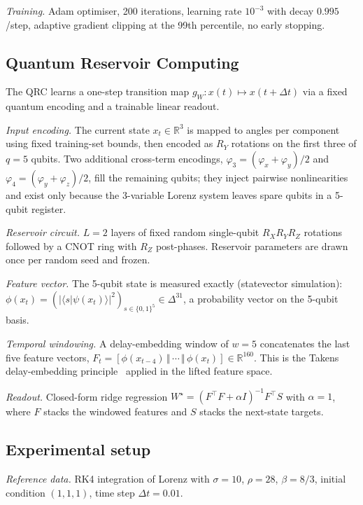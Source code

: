 \documentclass[a4paper,12pt]{iopart}
\begin{document}
\textit{Training.} Adam optimiser, 200 iterations, learning rate
$10^{-3}$ with decay $0.995$/step, adaptive gradient clipping at the
99th percentile, no early stopping.

\subsection{Quantum Reservoir Computing}

The QRC learns a one-step transition map
$g_W : x(t) \mapsto x(t + \Delta t)$ via a fixed quantum encoding and
a trainable linear readout.

\textit{Input encoding.} The current state $x_t \in \mathbb{R}^3$ is
mapped to angles per component using fixed training-set bounds, then
encoded as $R_Y$ rotations on the first three of $q = 5$ qubits. Two
additional cross-term encodings,
$\varphi_3 = (\varphi_x + \varphi_y)/2$ and
$\varphi_4 = (\varphi_y + \varphi_z)/2$, fill the remaining qubits;
they inject pairwise nonlinearities and exist only because the
3-variable Lorenz system leaves spare qubits in a 5-qubit register.

\textit{Reservoir circuit.} $L = 2$ layers of fixed random single-qubit
$R_X R_Y R_Z$ rotations followed by a CNOT ring with $R_Z$ post-phases.
Reservoir parameters are drawn once per random seed and frozen.

\textit{Feature vector.} The 5-qubit state is measured exactly
(statevector simulation):
$\phi(x_t) = (|\langle s | \psi(x_t)\rangle|^2)_{s \in \{0,1\}^5} \in \Delta^{31}$,
a probability vector on the 5-qubit basis.

\textit{Temporal windowing.} A delay-embedding window of $w = 5$
concatenates the last five feature vectors,
$F_t = [\phi(x_{t-4}) \,\Vert\, \cdots \,\Vert\, \phi(x_t)] \in \mathbb{R}^{160}$.
This is the Takens delay-embedding principle~\cite{takens1981} applied
in the lifted feature space.

\textit{Readout.} Closed-form ridge regression
$W^\star = (F^\top F + \alpha I)^{-1} F^\top S$ with $\alpha = 1$,
where $F$ stacks the windowed features and $S$ stacks the next-state
targets.

\subsection{Experimental setup}

\textit{Reference data.} RK4 integration of Lorenz with $\sigma = 10$,
$\rho = 28$, $\beta = 8/3$, initial condition $(1, 1, 1)$, time step
$\Delta t = 0.01$.
\end{document}
